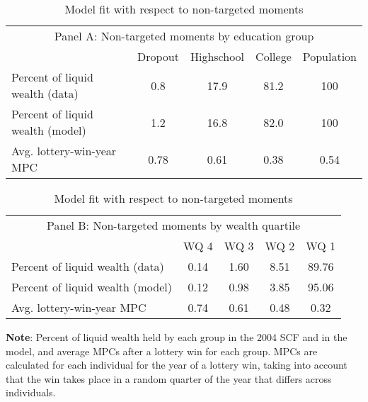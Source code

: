 \documentclass[\PathToRoot/\ProjectName]{subfiles}
\begin{document}
\begin{table}[tb] 
  \caption{Model fit with respect to non-targeted moments}
  \whenintegrated{\label{tab:nonTargetedMoments}} 
  \centering

  \centering
  \begin{tabular}{lcccc}
    \multicolumn{5}{c}{\small Panel A: Non-targeted moments by education group}    \\
    \addlinespace
    \hline
                                     & Dropout & Highschool & College & Population \\
    \hline
    Percent of liquid wealth (data)  & 0.8     & 17.9       & 81.2    & 100        \\
    Percent of liquid wealth (model) & 1.2     & 16.8       & 82.0    & 100        \\
    \hline
    Avg. lottery-win-year MPC        & 0.78    & 0.61       & 0.38    & 0.54       \\
    \hline
  \end{tabular}

  \vspace{0.5em}

  \centering
  \begin{tabular}{lcccc}
    \multicolumn{5}{c}{\small Panel B: Non-targeted moments by wealth quartile} \\
    \addlinespace
    \hline
                                     & WQ 4 & WQ 3 & WQ 2 & WQ 1                \\
    \hline
    Percent of liquid wealth (data)  & 0.14 & 1.60 & 8.51 & 89.76               \\
    Percent of liquid wealth (model) & 0.12 & 0.98 & 3.85 & 95.06               \\
    \hline
    Avg. lottery-win-year MPC        & 0.74 & 0.61 & 0.48 & 0.32                \\
    \hline
  \end{tabular}

  \vspace{0.5em}
  \noindent\parbox{\textwidth}{\footnotesize
    \textbf{Note}: Percent of liquid wealth held by each group in the 2004 SCF and in the model, and average MPCs after a lottery win for each group. MPCs are calculated for each individual for the year of a lottery win, taking into account that the win takes place in a random quarter of the year that differs across individuals.}

  \vspace{0.5em}

\end{table}
\end{document}
